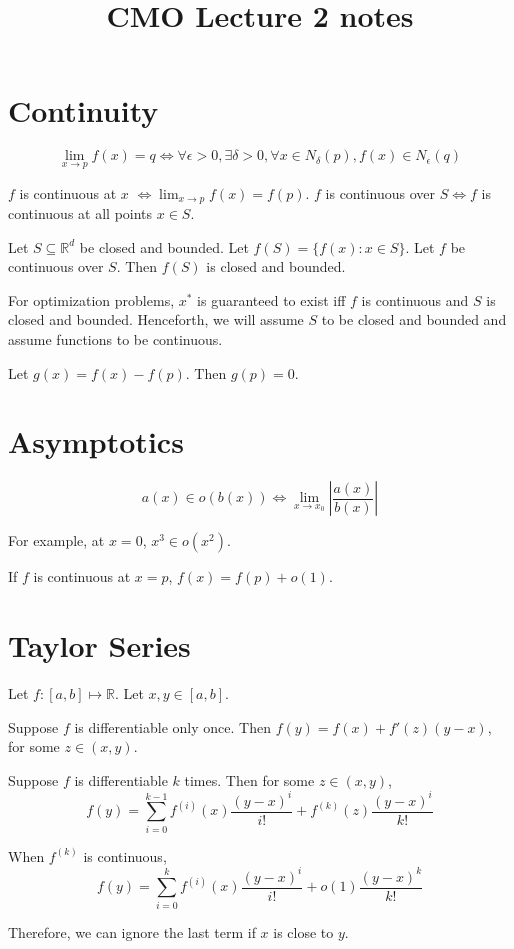 

\title{CMO Lecture 2 notes}



\maketitle
\initMinimal{}

\section{Continuity}

\begin{definition}
\[ \lim_{x\rightarrow p} f(x) = q \iff \forall \epsilon > 0, \exists \delta > 0,
\forall x \in N_{\delta}(p), f(x) \in N_{\epsilon}(q) \]
\end{definition}

\begin{definition}
$f$ is continuous at $x$ $\iff \lim_{x\rightarrow p} f(x) = f(p)$.
$f$ is continuous over $S \iff f$ is continuous at all points $x \in S$.
\end{definition}

\begin{theorem}
Let $S \subseteq \mathbb{R}^d$ be closed and bounded.
Let $f(S) = \{f(x): x \in S\}$.
Let $f$ be continuous over $S$.
Then $f(S)$ is closed and bounded.
\end{theorem}

For optimization problems, $x^*$ is guaranteed to exist iff
$f$ is continuous and $S$ is closed and bounded.
Henceforth, we will assume $S$ to be closed and bounded
and assume functions to be continuous.

Let $g(x) = f(x) - f(p)$. Then $g(p) = 0$.

\section{Asymptotics}

\[ a(x) \in o(b(x)) \iff \lim_{x \rightarrow x_0} \left| \frac{a(x)}{b(x)} \right| \]

For example, at $x=0$, $x^3 \in o(x^2)$.

If $f$ is continuous at $x=p$, $f(x) = f(p) + o(1)$.

\section{Taylor Series}

Let $f: [a,b] \mapsto \mathbb{R}$.
Let $x, y \in [a, b]$.

Suppose $f$ is differentiable only once.
Then $f(y) = f(x) + f'(z)(y-x)$, for some $z \in (x, y)$.

Suppose $f$ is differentiable $k$ times. Then for some $z \in (x, y)$,
\[ f(y) = \sum_{i=0}^{k-1}f^{(i)}(x)\frac{(y-x)^i}{i!} + f^{(k)}(z)\frac{(y-x)^i}{k!} \]

When $f^{(k)}$ is continuous,
\[ f(y) = \sum_{i=0}^k f^{(i)}(x)\frac{(y-x)^i}{i!} + o(1)\frac{(y-x)^k}{k!} \]

Therefore, we can ignore the last term if $x$ is close to $y$.



